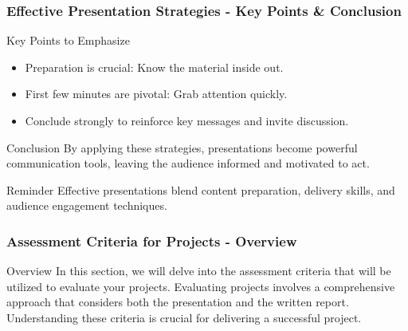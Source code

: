 \documentclass[aspectratio=169]{beamer}
\begin{document}
\begin{frame}[fragile]
    \frametitle{Effective Presentation Strategies - Key Points & Conclusion}
    \begin{block}{Key Points to Emphasize}
        \begin{itemize}
            \item Preparation is crucial: Know the material inside out.
            \item First few minutes are pivotal: Grab attention quickly.
            \item Conclude strongly to reinforce key messages and invite discussion.
        \end{itemize}
    \end{block}

    \begin{block}{Conclusion}
        By applying these strategies, presentations become powerful communication tools, leaving the audience informed and motivated to act.
    \end{block}
    
    \begin{block}{Reminder}
        Effective presentations blend content preparation, delivery skills, and audience engagement techniques.
    \end{block}
\end{frame}

\begin{frame}[fragile]
    \frametitle{Assessment Criteria for Projects - Overview}
    \begin{block}{Overview}
        In this section, we will delve into the assessment criteria that will be utilized to evaluate your projects. 
        Evaluating projects involves a comprehensive approach that considers both the presentation and the written report. 
        Understanding these criteria is crucial for delivering a successful project.
    \end{block}
\end{frame}
\end{document}
